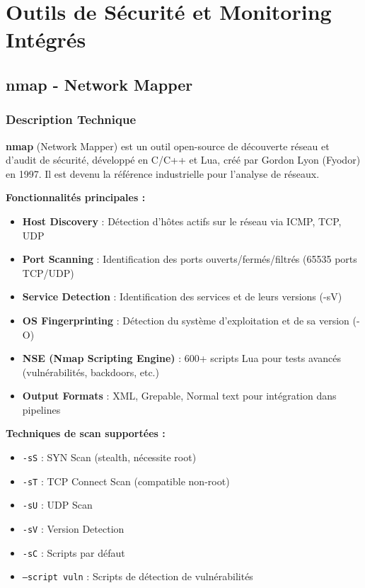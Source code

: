 \documentclass[11pt,a4paper]{report}
\begin{document}

\chapter{Outils de Sécurité et Monitoring Intégrés}

\section{nmap - Network Mapper}

\subsection{Description Technique}

\textbf{nmap} (Network Mapper) est un outil open-source de découverte réseau et d'audit de sécurité, développé en C/C++ et Lua, créé par Gordon Lyon (Fyodor) en 1997. Il est devenu la référence industrielle pour l'analyse de réseaux.

\textbf{Fonctionnalités principales :}
\begin{itemize}
    \item \textbf{Host Discovery} : Détection d'hôtes actifs sur le réseau via ICMP, TCP, UDP
    \item \textbf{Port Scanning} : Identification des ports ouverts/fermés/filtrés (65535 ports TCP/UDP)
    \item \textbf{Service Detection} : Identification des services et de leurs versions (-sV)
    \item \textbf{OS Fingerprinting} : Détection du système d'exploitation et de sa version (-O)
    \item \textbf{NSE (Nmap Scripting Engine)} : 600+ scripts Lua pour tests avancés (vulnérabilités, backdoors, etc.)
    \item \textbf{Output Formats} : XML, Grepable, Normal text pour intégration dans pipelines
\end{itemize}

\textbf{Techniques de scan supportées :}
\begin{itemize}
    \item \texttt{-sS} : SYN Scan (stealth, nécessite root)
    \item \texttt{-sT} : TCP Connect Scan (compatible non-root)
    \item \texttt{-sU} : UDP Scan
    \item \texttt{-sV} : Version Detection
    \item \texttt{-sC} : Scripts par défaut
    \item \texttt{--script vuln} : Scripts de détection de vulnérabilités
\end{itemize}
\end{document}

